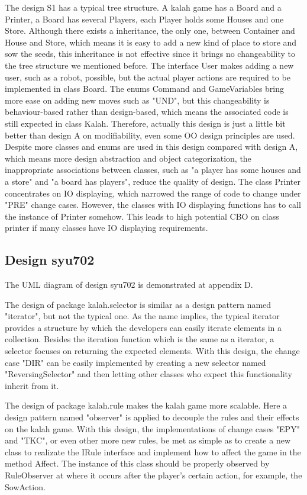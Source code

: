 \documentclass[conference]{IEEEtran}
\begin{document}
	The design S1 has a typical tree structure. A kalah game has a Board and a Printer, a Board has several Players, each Player holds some Houses and one Store. Although there exists a inheritance, the only one, between Container and House and Store, which means it is easy to add a new kind of place to store and sow the seeds, this inheritance is not effective since it brings no changeability to the tree structure we mentioned before. The interface User makes adding a new user, such as a robot, possible, but the actual player actions are required to be implemented in class Board. The enums Command and GameVariables bring more ease on adding new moves such as "UND", but this changeability is behaviour-based rather than design-based, which means the associated code is still expected in class Kalah. Therefore, actually this design is just a little bit better than design A on modifiability, even some \gls{OO} design principles are used. Despite more classes and enums are used in this design compared with design A, which means more design abstraction and object categorization, the inappropriate associations between classes, such as "a player has some houses and a store" and "a board has players", reduce the quality of design. The class Printer concentrates on IO displaying, which narrowed the range of code to change under "PRE" change cases. However, the classes with IO displaying functions has to call the instance of Printer somehow. This leads to high potential \gls{CBO} on class printer if many classes have IO displaying requirements.
	
	\subsection{Design syu702}	
	The UML diagram of design syu702 is demonstrated at appendix D.
		
	The design of package kalah.selector is similar as a design pattern named "iterator", but not the typical one. As the name implies, the typical iterator provides a structure by which the developers can easily iterate elements in a collection. Besides the iteration function which is the same as a iterator, a selector focuses on returning the expected elements. With this design, the change case "DIR" can be easily implemented by creating a new selector named "ReversingSelector" and then letting other classes who expect this functionality inherit from it.
	
	The design of package kalah.rule makes the kalah game more scalable. Here a design pattern named "observer" is applied to decouple the rules and their effects on the kalah game. With this design, the implementations of change cases "EPY" and "TKC", or even other more new rules, be met as simple as to create a new class to realizate the IRule interface and implement how to affect the game in the method Affect. The instance of this class should be properly observed by RuleObserver at where it occurs after the player's certain action, for example, the SowAction.
	
\end{document}
